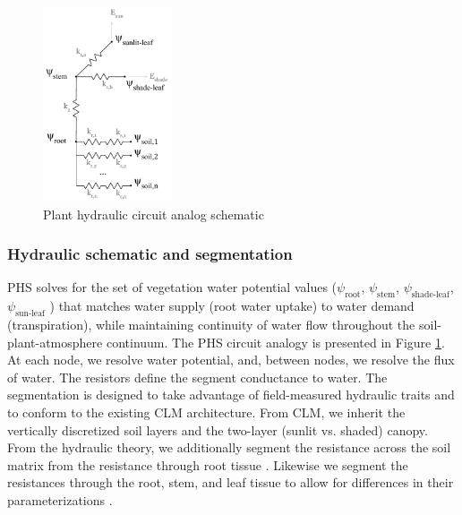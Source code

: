 \documentclass[draft,linenumbers]{agujournal}
\begin{document}
  \begin{figure}[h]
     \centering
     \includegraphics[width=9pc]{../figs/circuit.pdf}
     \caption{Plant hydraulic circuit analog schematic}
     \label{circuit}
  \end{figure}

  \subsubsection{Hydraulic schematic and segmentation}
  PHS solves for the set of vegetation water potential values 
  ($\psi_{\text{root}}$, $\psi_{\text{stem}}$, $\psi_{\text{shade-leaf}}$, $\psi_{\text{sun-leaf}}$ ) 
  that matches water supply (root water uptake) to water demand (transpiration), 
  while maintaining continuity of water flow throughout the soil-plant-atmosphere continuum.
  The PHS circuit analogy is presented in Figure \ref{circuit}.
  At each node, we resolve water potential, and, between nodes, we resolve the flux of water.
  The resistors define the segment conductance to water. 
  The segmentation is designed to take advantage of field-measured hydraulic traits 
  and to conform to the existing CLM architecture.
  From CLM, we inherit the vertically discretized soil layers and the two-layer (sunlit vs. shaded) canopy.
  From the hydraulic theory, we additionally segment the resistance across the soil matrix from the 
  resistance through root tissue \citep{williams1996}. 
  Likewise we segment the resistances through the root, stem, and leaf tissue to allow for differences
  in their parameterizations \citep{simonin2015, sperry2015}.
\end{document}

